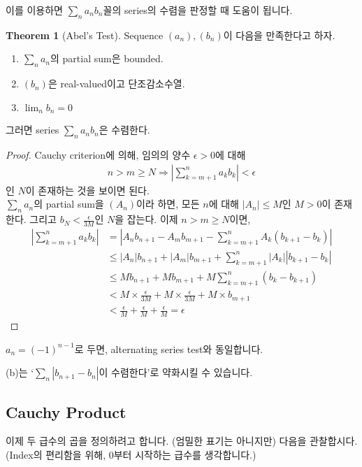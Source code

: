 \documentclass[12pt]{article}
\theoremstyle{definition}
\newtheorem{thm}{Theorem}[section]
\def\eps{\epsilon}
\newcommand{\abs}[1]{\left\vert#1\right\vert}
\begin{document}
이를 이용하면 \(\sum_n a_n b_n\)꼴의 series의 수렴을 판정할 때 도움이 됩니다.

\begin{thm}[Abel's Test]
	Sequence \((a_n), (b_n)\)이 다음을 만족한다고 하자.
	\begin{enumerate}[label=(\alph*), leftmargin=2\parindent]
		\item
		\(\sum_n a_n\)의 partial sum은 bounded.
		\item
		\((b_n)\)은 real-valued이고 단조감소수열.
		\item
		\(\lim_n b_n = 0\)
	\end{enumerate}
	그러면 series \(\sum_n a_n b_n\)은 수렴한다.
\end{thm}
\begin{proof}
	Cauchy criterion에 의해, 임의의 양수 \(\eps > 0\)에 대해 
	\begin{align*}
		n > m \ge N \Rightarrow \abs{\sum_{k=m+1}^{n} a_k b_k} < \eps
	\end{align*}
	인 \(N\)이 존재하는 것을 보이면 된다.\\
	\(\sum_n a_n\)의 partial sum을 \((A_n)\)이라 하면, 모든 \(n\)에 대해 \(\abs{A_n} \le M\)인 \(M > 0\)이 존재한다. 그리고 \(b_N < \frac{\eps}{3M}\)인 \(N\)을 잡는다. 이제 \(n > m \ge N\)이면,
	\begin{align*}
		\abs{\sum_{k=m+1}^{n} a_k b_k} &= \abs{A_n b_{n+1} - A_m b_{m+1} - \sum_{k=m+1}^n A_k (b_{k+1} - b_k)} \\
		& \le \abs{A_n} b_{n+1} + \abs{A_m} b_{m+1} + \sum_{k=m+1}^n \abs{A_k}\abs{b_{k+1}-b_k}\\
		& \le  Mb_{n+1} + M b_{m+1} + M \sum_{k=m+1}^n (b_k - b_{k+1})\\
		& < M \times \frac{\eps}{3M} + M \times \frac{\eps}{3M} + M \times b_{m+1}\\
		& < \frac{\eps}{M} + \frac{\eps}{M} + \frac{\eps}{M} = \eps
	\end{align*}
\end{proof}

\(a_n = (-1)^{n-1}\)로 두면, alternating series test와 동일합니다.

(b)는 `\(\sum_n \abs{b_{n+1} - b_n}\)이 수렴한다'로 약화시킬 수 있습니다.

\subsection{Cauchy Product}

이제 두 급수의 곱을 정의하려고 합니다. (엄밀한 표기는 아니지만) 다음을 관찰합시다. (Index의 편리함을 위해, 0부터 시작하는 급수를 생각합니다.)
\end{document}
